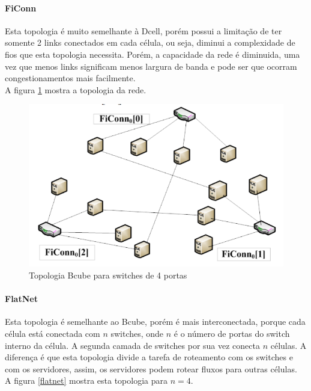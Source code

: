 \documentclass[12pt,a4paper]{report}
\begin{document}
\paragraph{FiConn}
Esta topologia é muito semelhante à Dcell, porém possui a limitação de ter somente 2 links conectados em cada célula, ou seja, diminui a complexidade de fios que esta topologia necessita. Porém, a capacidade da rede é diminuida, uma vez que menos links significam menos largura de banda e pode ser que ocorram congestionamentos mais facilmente.\\

A figura \ref{ficonn} mostra a topologia da rede.\\

\begin{figure}[H]
\centering
\includegraphics[width=.8\textwidth]{imagens/ficonn.png}
\caption{Topologia Bcube para switches de 4 portas}
\label{ficonn}
\end{figure}

\paragraph{FlatNet}
Esta topologia é semelhante ao Bcube, porém é mais interconectada, porque cada célula está conectada com $n$ switches, onde $n$ é o número de portas do switch interno da célula. A segunda camada de switches por sua vez conecta $n$ células. A diferença é que esta topologia divide a tarefa de roteamento com os switches e com os servidores, assim, os servidores podem rotear fluxos para outras células.\\

A figura \ref{flatnet} mostra esta topologia para $n=4$.\\
\end{document}
